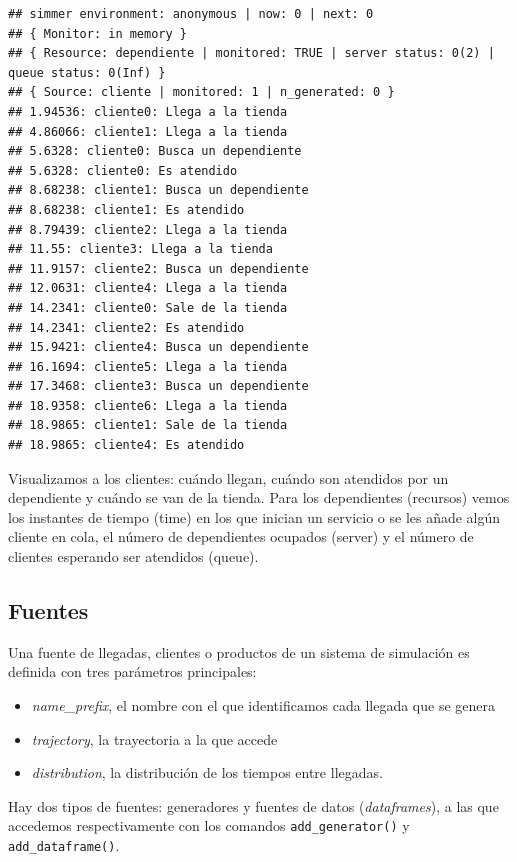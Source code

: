 \documentclass[
]{book}
\providecommand{\tightlist}{%
  \setlength{\itemsep}{0pt}\setlength{\parskip}{0pt}}
\theoremstyle{definition}
\theoremstyle{definition}
\theoremstyle{definition}
\theoremstyle{definition}
\theoremstyle{remark}
\begin{document}
\begin{verbatim}
## simmer environment: anonymous | now: 0 | next: 0
## { Monitor: in memory }
## { Resource: dependiente | monitored: TRUE | server status: 0(2) | queue status: 0(Inf) }
## { Source: cliente | monitored: 1 | n_generated: 0 }
## 1.94536: cliente0: Llega a la tienda
## 4.86066: cliente1: Llega a la tienda
## 5.6328: cliente0: Busca un dependiente
## 5.6328: cliente0: Es atendido
## 8.68238: cliente1: Busca un dependiente
## 8.68238: cliente1: Es atendido
## 8.79439: cliente2: Llega a la tienda
## 11.55: cliente3: Llega a la tienda
## 11.9157: cliente2: Busca un dependiente
## 12.0631: cliente4: Llega a la tienda
## 14.2341: cliente0: Sale de la tienda
## 14.2341: cliente2: Es atendido
## 15.9421: cliente4: Busca un dependiente
## 16.1694: cliente5: Llega a la tienda
## 17.3468: cliente3: Busca un dependiente
## 18.9358: cliente6: Llega a la tienda
## 18.9865: cliente1: Sale de la tienda
## 18.9865: cliente4: Es atendido
\end{verbatim}

Visualizamos a los clientes: cuándo llegan, cuándo son atendidos por un dependiente y cuándo se van de la tienda. Para los dependientes (recursos) vemos los instantes de tiempo (time) en los que inician un servicio o se les añade algún cliente en cola, el número de dependientes ocupados (server) y el número de clientes esperando ser atendidos (queue).

\hypertarget{fuentes}{%
\subsection{Fuentes}\label{fuentes}}

Una fuente de llegadas, clientes o productos de un sistema de simulación es definida con tres parámetros principales:

\begin{itemize}
\tightlist
\item
  \emph{name\_prefix}, el nombre con el que identificamos cada llegada que se genera
\item
  \emph{trajectory}, la trayectoria a la que accede
\item
  \emph{distribution}, la distribución de los tiempos entre llegadas.
\end{itemize}

Hay dos tipos de fuentes: generadores y fuentes de datos (\emph{dataframes}), a las que accedemos respectivamente con los comandos \texttt{add\_generator()} y \texttt{add\_dataframe()}.
\end{document}

